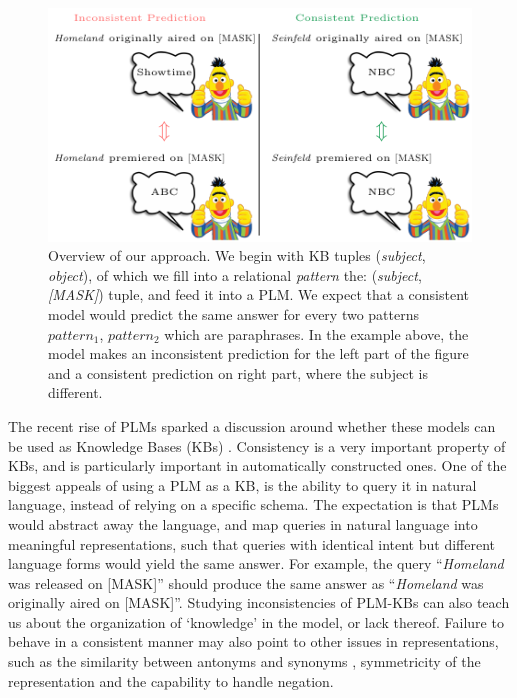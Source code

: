 \begin{figure}[t!]
\centering

\includegraphics[width=1.\columnwidth]{figures/overview}

\caption{Overview of our approach. We begin with KB tuples (\textit{subject}, \textit{object}), of which we fill into a relational \textit{pattern} the: (\textit{subject}, \textit{[MASK]}) tuple,
and feed it into a PLM. 
We expect that a consistent model would predict the same answer for every two patterns $pattern_1$, $pattern_2$ which are paraphrases. 
In the example above, the model makes an inconsistent prediction for the left part of the figure and a consistent prediction on right part, where the subject is different.}
\label{fig:overview}
\end{figure}


The recent rise of PLMs sparked a discussion around whether these models can be used as Knowledge Bases (KBs) \cite{lama,petroni2020how,alpaqa,roberts2020much}. 
Consistency is a very important property of KBs, and is particularly important in automatically constructed ones.
One of the biggest appeals of using a PLM as a KB, is the ability to query it in natural language, instead of relying on a specific schema.
The expectation is that PLMs would abstract away the language, and map queries in natural language into meaningful representations, such that queries with identical intent but different language forms would yield the same answer. 
For example, the query ``\textit{Homeland} was released on [MASK]'' should produce the same answer as ``\textit{Homeland} was originally aired on [MASK]''.
Studying inconsistencies of PLM-KBs can also teach us about the organization of `knowledge' in the model, or lack thereof. 
Failure to behave in a consistent manner may also point to other issues in representations, 
such as the similarity between antonyms and synonyms \cite{nguyen2016integrating}, symmetricity of the representation and the capability to handle negation. 

